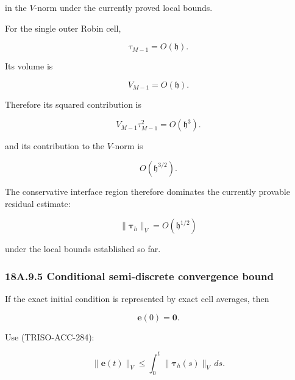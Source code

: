 \documentclass[11pt,a4paper]{article}
\begin{document}
in the $V$-norm under the currently proved local bounds.

For the single outer Robin cell,

\begin{equation}
\tau_{M-1}=O(\mathfrak h).
\tag{TRISO-ACC-294}
\label{eq:triso-acc-294}
\end{equation}

Its volume is

\begin{equation}
V_{M-1}=O(\mathfrak h).
\tag{TRISO-ACC-295}
\label{eq:triso-acc-295}
\end{equation}

Therefore its squared contribution is

\begin{equation}
V_{M-1}\tau_{M-1}^2
=
O(\mathfrak h^3).
\tag{TRISO-ACC-296}
\label{eq:triso-acc-296}
\end{equation}

and its contribution to the $V$-norm is

\begin{equation}
O(\mathfrak h^{3/2}).
\tag{TRISO-ACC-297}
\label{eq:triso-acc-297}
\end{equation}

The conservative interface region therefore dominates the currently provable residual estimate:

\begin{equation}
\boxed{
\|\boldsymbol\tau_h\|_V
=
O(\mathfrak h^{1/2})
}
\tag{TRISO-ACC-298}
\label{eq:triso-acc-298}
\end{equation}

under the local bounds established so far.

\subsubsection*{18A.9.5 Conditional semi-discrete convergence bound}

If the exact initial condition is represented by exact cell averages, then

\begin{equation}
\mathbf e(0)=\mathbf0.
\tag{TRISO-ACC-299}
\label{eq:triso-acc-299}
\end{equation}

Use (TRISO-ACC-284):

\begin{equation}
\|\mathbf e(t)\|_V
\le
\int_0^t
\|\boldsymbol\tau_h(s)\|_V\,ds.
\tag{TRISO-ACC-300}
\label{eq:triso-acc-300}
\end{equation}
\end{document}
